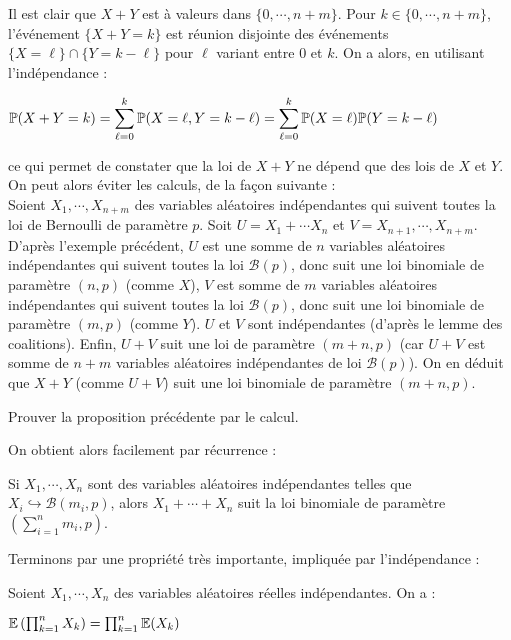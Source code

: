 \documentclass[12pt,a4paper]{report}
\begin{document}
\begin{demo}{}
Il est clair que $X+Y$ est à valeurs dans $\{0,\cdots,n+m\}$. Pour $k \in \{0,\cdots,n+m\}$, l'événement $\{X+Y = k\}$ est réunion disjointe des événements $\{X=\ell\} \cap \{Y = k-\ell\}$ pour $\ell$ variant entre $0$ et $k$. On a alors, en utilisant l'indépendance : 
\begin{center}
$\mathbb{P}(X+Y=k) = \displaystyle \sum_{\ell = 0}^k \mathbb{P}(X=\ell,Y=k-\ell) = \sum_{\ell = 0}^k \mathbb{P}(X=\ell) \mathbb{P}(Y=k-\ell)$
\end{center}
ce qui permet de constater que la loi de $X+Y$ ne dépend que des lois de $X$ et $Y$. On peut alors éviter les calculs, de la façon suivante : \\
Soient $X_1,\cdots,X_{n+m}$ des variables aléatoires indépendantes qui suivent toutes la loi de Bernoulli de paramètre $p$. Soit $U = X_1 + \cdots X_n$ et $V = X_{n+1},\cdots,X_{n+m}$. D'après l'exemple précédent, $U$ est une somme de $n$ variables aléatoires indépendantes qui suivent toutes la loi $\mathcal{B}(p)$, donc suit une loi binomiale de paramètre $(n,p)$ (comme $X$), $V$ est somme de $m$ variables aléatoires indépendantes qui suivent toutes la loi $\mathcal{B}(p)$, donc suit une loi binomiale de paramètre $(m,p)$ (comme $Y$). $U$ et $V$ sont indépendantes (d'après le lemme des coalitions). Enfin, $U+V$ suit une loi de paramètre $(m+n,p)$ (car $U+V$ est somme de $n+m$ variables aléatoires indépendantes de loi $\mathcal{B}(p)$). On en déduit que $X+Y$ (comme $U+V$) suit une loi binomiale de paramètre $(m+n,p)$.
\end{demo}

\begin{exemple}[Exercice 17]{}
Prouver la proposition précédente par le calcul.
\end{exemple}

On obtient alors facilement par récurrence : 
\begin{corollaire}{}{}
Si $X_1,\cdots,X_n$ sont des variables aléatoires indépendantes telles que $X_i \hookrightarrow \mathcal{B}(m_i,p)$, alors $X_1 + \cdots + X_n$ suit la loi binomiale de paramètre $(\sum_{i=1}^n m_i,p)$. 
\end{corollaire}

Terminons par une propriété très importante, impliquée par l'indépendance :
\begin{theoreme}{}{}
Soient $X_1,\cdots,X_n$ des variables aléatoires réelles indépendantes. On a :
\begin{center}
$\mathbb{E}\left(\prod_{k=1}^n X_k\right) = \prod_{k=1}^n \mathbb{E}(X_k)$
\end{center}
\end{theoreme}
\end{document}
